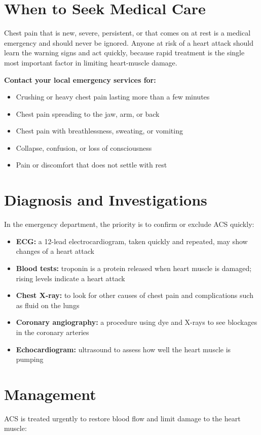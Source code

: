 \section*{When to Seek Medical Care}
Chest pain that is new, severe, persistent, or that comes on at rest is a medical emergency and should never be ignored. Anyone at risk of a heart attack should learn the warning signs and act quickly, because rapid treatment is the single most important factor in limiting heart-muscle damage.

\textbf{Contact your local emergency services for:}
\begin{itemize}
    \item Crushing or heavy chest pain lasting more than a few minutes
    \item Chest pain spreading to the jaw, arm, or back
    \item Chest pain with breathlessness, sweating, or vomiting
    \item Collapse, confusion, or loss of consciousness
    \item Pain or discomfort that does not settle with rest
\end{itemize}

\section*{Diagnosis and Investigations}
In the emergency department, the priority is to confirm or exclude ACS quickly:

\begin{itemize}
    \item \textbf{ECG:} a 12-lead electrocardiogram, taken quickly and repeated, may show changes of a heart attack
    \item \textbf{Blood tests:} troponin is a protein released when heart muscle is damaged; rising levels indicate a heart attack
    \item \textbf{Chest X-ray:} to look for other causes of chest pain and complications such as fluid on the lungs
    \item \textbf{Coronary angiography:} a procedure using dye and X-rays to see blockages in the coronary arteries
    \item \textbf{Echocardiogram:} ultrasound to assess how well the heart muscle is pumping
\end{itemize}

\section*{Management}
ACS is treated urgently to restore blood flow and limit damage to the heart muscle:

